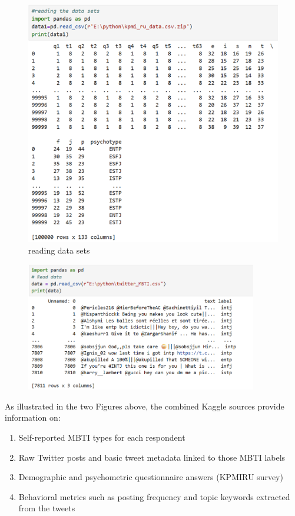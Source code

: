 \documentclass[12pt]{article}
\begin{document}
	\begin{figure}[H]
		\centering
		\includegraphics{Q1P1} %
		\caption{reading data sets}
	
	\end{figure}
	\begin{figure}[H]
		\centering
		\includegraphics[width=0.9\textwidth]{Q1P2}
		
	\end{figure}
	As illustrated in the two Figures above, the combined Kaggle sources provide information on:
	\begin{enumerate}
		\item Self-reported MBTI types for each respondent
		\item Raw Twitter posts and basic tweet metadata linked to those MBTI labels  
		\item Demographic and psychometric questionnaire answers (KPMIRU survey) 
		\item Behavioral metrics such as posting frequency and topic keywords extracted from the tweets
	\end{enumerate}
	
\end{document}
